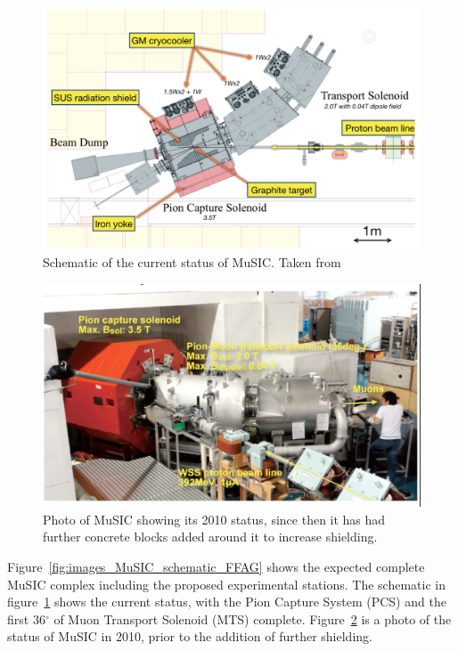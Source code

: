 \begin{figure}[htbp]
  \centering
    \includegraphics[width=.9\textwidth]{images/MuSIC_current_schematic.png}
  \caption{Schematic of the current status of MuSIC. Taken from~\cite{first_measurements_at_music}}
  \label{fig:images_MuSIC_current_schematic}
\end{figure}
\begin{figure}[htbp]
  \centering
    \includegraphics[width=.9\textwidth]{images/MuSIC_photo.png}
  \caption{Photo of MuSIC showing its 2010 status, since then it has had further concrete blocks added around it to increase shielding.}
  \label{fig:images_MuSIC_photo}
\end{figure}

Figure~\ref{fig:images_MuSIC_schematic_FFAG} shows the expected complete MuSIC complex including the proposed experimental stations. The schematic in figure~\ref{fig:images_MuSIC_current_schematic} shows the current status, with the Pion Capture System (PCS) and the first 36\(^{\circ}\) of Muon Transport Solenoid (MTS) complete. Figure~\ref{fig:images_MuSIC_photo} is a photo of the status of MuSIC in 2010, prior to the addition of further shielding.

